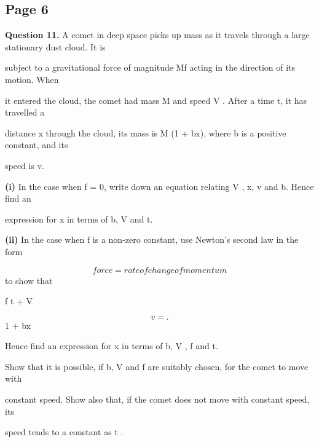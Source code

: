 \documentclass[12pt]{article}
\begin{document}
\subsection*{Page 6}
\begin{flushleft}
\bigskip\textbf{Question 11.} A comet in deep space picks up mass as it travels through a large stationary dust cloud. It is\par
subject to a gravitational force of magnitude Mf acting in the direction of its motion. When\par
it entered the cloud, the comet had mass M and speed V . After a time t, it has travelled a\par
distance x through the cloud, its mass is M (1 + bx), where b is a positive constant, and its\par
speed is v.\par
\textbf{(i)} In the case when f = 0, write down an equation relating V , x, v and b. Hence find an\par
expression for x in terms of b, V and t.\par
\textbf{(ii)} In the case when f is a non-zero constant, use Newton's second law in the form\par
\[force = rate of change of momentum\]
to show that\par
f t + V\par
\[v = .\]
1 + bx\par
Hence find an expression for x in terms of b, V , f and t.\par
Show that it is possible, if b, V and f are suitably chosen, for the comet to move with\par
constant speed. Show also that, if the comet does not move with constant speed, its\par
speed tends to a constant as t \to \infty.\par
\end{flushleft}
\end{document}
